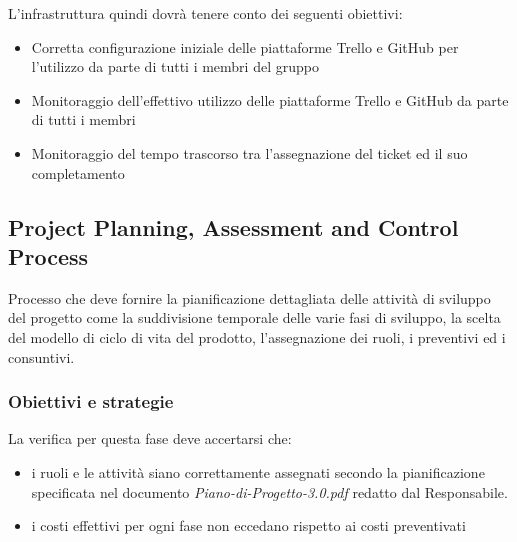 \documentclass[a4paper,11pt]{article}
\begin{document}
L'infrastruttura quindi dovrà tenere conto dei seguenti obiettivi:
\begin{itemize}
\item Corretta configurazione iniziale delle piattaforme Trello e GitHub per l'utilizzo da parte di tutti i membri del gruppo
\item Monitoraggio dell'effettivo utilizzo delle piattaforme Trello e GitHub da parte di tutti i membri
\item Monitoraggio del tempo trascorso tra l'assegnazione del ticket ed il suo completamento
\end{itemize} 


\subsection{Project Planning, Assessment and Control Process}
Processo che deve fornire la pianificazione dettagliata delle attività di sviluppo del progetto come la suddivisione temporale delle varie fasi di sviluppo, la scelta del modello di ciclo di vita del prodotto, l'assegnazione dei ruoli, i preventivi ed i consuntivi.

\subsubsection{Obiettivi e strategie}
La verifica per questa fase deve accertarsi che:
\begin{itemize}
\item i ruoli e le attività siano correttamente assegnati secondo la pianificazione specificata nel documento \textit{Piano-di-Progetto-3.0.pdf} redatto dal Responsabile.
\item i costi effettivi per ogni fase non eccedano rispetto ai costi preventivati
\end{itemize}
\end{document}
